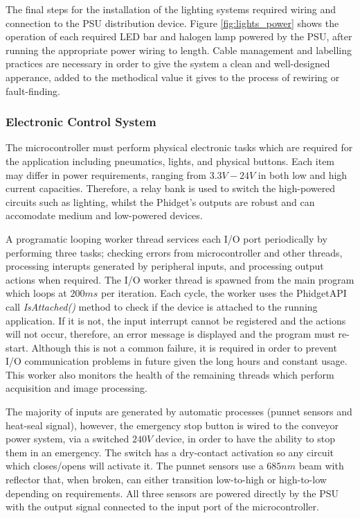 \documentclass[fleqn,twoside,12pt]{report}
\begin{document}
The final steps for the installation of the lighting systems required wiring and connection to the PSU distribution device. Figure \ref{fig:lights_power} shows the operation of each required LED bar and halogen lamp powered by the PSU, after running the appropriate power wiring to length. Cable management and labelling practices are necessary in order to give the system a clean and well-designed apperance, added to the methodical value it gives to the process of rewiring or fault-finding.



\subsubsection{Electronic Control System}


The microcontroller must perform physical electronic tasks which are required for the application including pneumatics, lights, and physical buttons. Each item may differ in power requirements, ranging from $3.3V-24V$ in both low and high current capacities. Therefore, a relay bank is used to switch the high-powered circuits such as lighting, whilst the Phidget\texttrademark's outputs are robust and can accomodate medium and low-powered devices. 


A programatic looping worker thread services each I/O port periodically by performing three tasks; checking errors from microcontroller and other threads, processing interupts generated by peripheral inputs, and processing output actions when required. The I/O worker thread is spawned from the main program which loops at $200ms$ per iteration. Each cycle, the worker uses the Phidget\texttrademark API call \textit{IsAttached()} method to check if the device is attached to the running application. If it is not, the input interrupt cannot be registered and the actions will not occur, therefore, an error message is displayed and the program must re-start. Although this is not a common failure, it is required in order to prevent I/O communication problems in future given the long hours and constant usage. This worker also monitors the health of the remaining threads which perform acquisition and image processing. 

The majority of inputs are generated by automatic processes (punnet sensors and heat-seal signal), however, the emergency stop button is wired to the conveyor power system, via a switched $240V$ device, in order to have the ability to stop them in an emergency. The switch has a dry-contact activation so any circuit which closes/opens will activate it. The punnet sensors use a $685nm$ beam with reflector that, when broken, can either transition low-to-high or high-to-low depending on requirements. All three sensors are powered directly by the PSU with the output signal connected to the input port of the microcontroller. 
\end{document}
